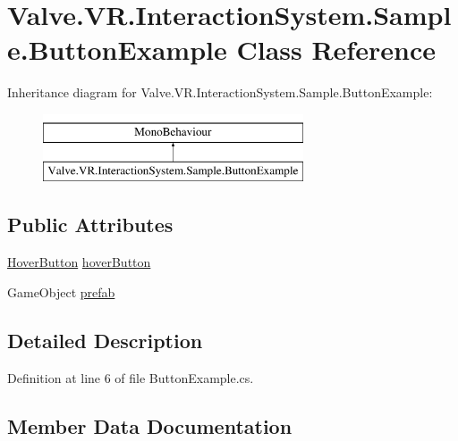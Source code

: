 \hypertarget{class_valve_1_1_v_r_1_1_interaction_system_1_1_sample_1_1_button_example}{}\section{Valve.\+V\+R.\+Interaction\+System.\+Sample.\+Button\+Example Class Reference}
\label{class_valve_1_1_v_r_1_1_interaction_system_1_1_sample_1_1_button_example}
Inheritance diagram for Valve.\+V\+R.\+Interaction\+System.\+Sample.\+Button\+Example\+:\begin{figure}[H]
\begin{center}
\leavevmode
\includegraphics[height=2.000000cm]{class_valve_1_1_v_r_1_1_interaction_system_1_1_sample_1_1_button_example}
\end{center}
\end{figure}
\subsection*{Public Attributes}
\begin{DoxyCompactItemize}
\item 
\mbox{\hyperlink{class_valve_1_1_v_r_1_1_interaction_system_1_1_hover_button}{Hover\+Button}} \mbox{\hyperlink{class_valve_1_1_v_r_1_1_interaction_system_1_1_sample_1_1_button_example_a96231382d398136b857b1ca992ca7ad7}{hover\+Button}}
\item 
Game\+Object \mbox{\hyperlink{class_valve_1_1_v_r_1_1_interaction_system_1_1_sample_1_1_button_example_a6304ed983b27429144348fed86e6a74b}{prefab}}
\end{DoxyCompactItemize}


\subsection{Detailed Description}


Definition at line 6 of file Button\+Example.\+cs.



\subsection{Member Data Documentation}
\mbox{\label{class_valve_1_1_v_r_1_1_interaction_system_1_1_sample_1_1_button_example_a96231382d398136b857b1ca992ca7ad7}} 
